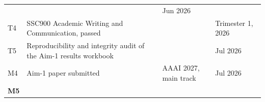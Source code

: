 \documentclass[
  11pt,
]{article}
\begin{document}
\begin{longtable}[]{@{}llll@{}}
\begin{minipage}[t]{0.49\columnwidth}
\end{minipage} & \begin{minipage}[t]{0.19\columnwidth}\raggedright
\strut
\end{minipage} & \begin{minipage}[t]{0.15\columnwidth}\raggedright
Jun 2026\strut
\end{minipage}\tabularnewline
\begin{minipage}[t]{0.06\columnwidth}\raggedright
T4\strut
\end{minipage} & \begin{minipage}[t]{0.49\columnwidth}\raggedright
SSC900 Academic Writing and Communication, passed\strut
\end{minipage} & \begin{minipage}[t]{0.19\columnwidth}\raggedright
\strut
\end{minipage} & \begin{minipage}[t]{0.15\columnwidth}\raggedright
Trimester 1, 2026\strut
\end{minipage}\tabularnewline
\begin{minipage}[t]{0.06\columnwidth}\raggedright
T5\strut
\end{minipage} & \begin{minipage}[t]{0.49\columnwidth}\raggedright
Reproducibility and integrity audit of the Aim-1 results workbook\strut
\end{minipage} & \begin{minipage}[t]{0.19\columnwidth}\raggedright
\strut
\end{minipage} & \begin{minipage}[t]{0.15\columnwidth}\raggedright
Jul 2026\strut
\end{minipage}\tabularnewline
\begin{minipage}[t]{0.06\columnwidth}\raggedright
M4\strut
\end{minipage} & \begin{minipage}[t]{0.49\columnwidth}\raggedright
Aim-1 paper submitted\strut
\end{minipage} & \begin{minipage}[t]{0.19\columnwidth}\raggedright
AAAI 2027, main track\strut
\end{minipage} & \begin{minipage}[t]{0.15\columnwidth}\raggedright
Jul 2026\strut
\end{minipage}\tabularnewline
\begin{minipage}[t]{0.06\columnwidth}\raggedright
\textbf{M5}\strut
\end{minipage} & \begin{minipage}[t]{0.49\columnwidth}\raggedright

\end{minipage}
\end{longtable}
\end{document}
